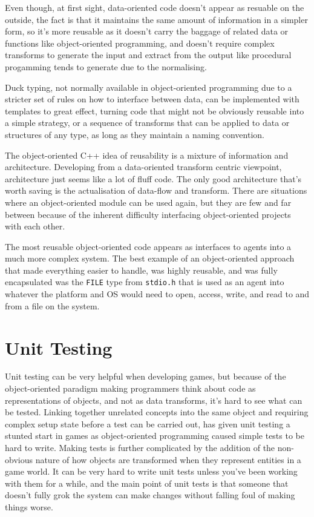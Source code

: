 Even though, at first sight, data-oriented code doesn't appear as resuable on
the outside, the fact is that it maintains the same amount of information in a
simpler form, so it's more reusable as it doesn't carry the baggage of related
data or functions like object-oriented programming, and doesn't require complex
transforms to generate the input and extract from the output like procedural
progamming tends to generate due to the normalising.

Duck typing, not normally available in object-oriented programming due to a
stricter set of rules on how to interface between data, can be implemented with
templates to great effect, turning code that might not be obviously reusable
into a simple strategy, or a sequence of transforms that can be applied to data
or structures of any type, as long as they maintain a naming convention.

The object-oriented C++ idea of reusability is a mixture of information and
architecture. Developing from a data-oriented transform centric viewpoint,
architecture just seems like a lot of fluff code. The only good architecture
that's worth saving is the actualisation of data-flow and transform. There are
situations where an object-oriented module can be used again, but they are few
and far between because of the inherent difficulty interfacing object-oriented
projects with each other.

The most reusable object-oriented code appears as interfaces to agents into a
much more complex system. The best example of an object-oriented approach that
made everything easier to handle, was highly reusable, and was fully
encapsulated was the \texttt{FILE} type from \texttt{stdio.h} that is used as
an agent into whatever the platform and OS would need to open, access, write,
and read to and from a file on the system.

\section{Unit Testing}

Unit testing can be very helpful when developing games, but because of the
object-oriented paradigm making programmers think about code as representations
of objects, and not as data transforms, it's hard to see what can be tested.
Linking together unrelated concepts into the same object and requiring complex
setup state before a test can be carried out, has given unit testing a stunted
start in games as object-oriented programming caused simple tests to be hard to
write. Making tests is further complicated by the addition of the non-obvious
nature of how objects are transformed when they represent entities in a game
world. It can be very hard to write unit tests unless you've been working with
them for a while, and the main point of unit tests is that someone that doesn't
fully grok the system can make changes without falling foul of making things
worse.

